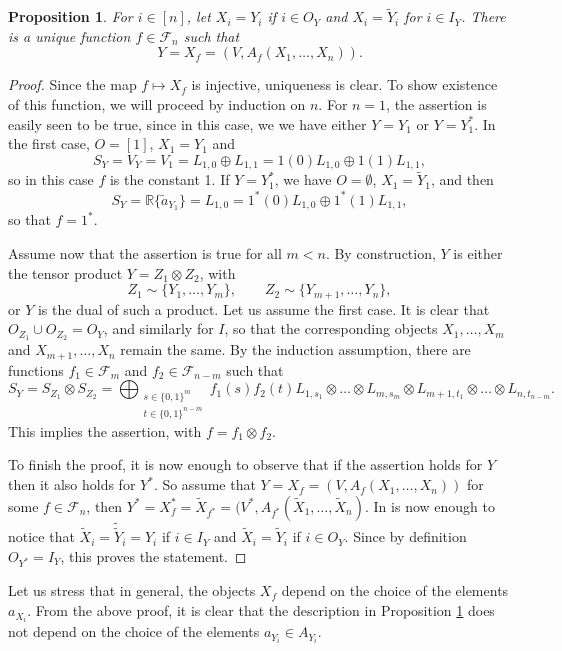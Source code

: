 \documentclass[12pt]{article}
\newtheorem{prop}{Proposition}
\theoremstyle{definition}
\theoremstyle{remark}
\def\Fe{\mathcal F}
\begin{document}
\begin{prop}\label{prop:boolean} For $i\in [n]$, let 
$X_i=Y_i$ if $i\in O_Y$ and $X_i=\tilde Y_i$ for $i\in I_Y$. 
There is a unique function $f\in \Fe_n$ such that 
\[
Y= X_f=(V, A_f(X_1,\dots,X_n)).
\]

\end{prop}

\begin{proof} Since the map $f\mapsto X_f$ is injective, uniqueness is clear.  To show existence of this
function, we will proceed by induction on $n$. For $n=1$, the assertion is easily seen
to be true, since in this case, we we have either $Y=Y_1$ or $Y=Y_1^*$. In the first case, $O=[1]$,
$X_1=Y_1$ and 
\[
S_Y=V_Y=V_1=L_{1,0}\oplus L_{1,1}=1(0)L_{1,0}\oplus 1(1)L_{1,1},
\]
so in this case $f$ is the constant 1. If $Y=Y_1^*$, we have $O=\emptyset$, $X_1=\tilde
Y_1$, and then
\[
S_Y=\mathbb R\{\tilde a_{Y_1}\}=L_{1,0}=1^*(0)L_{1,0}\oplus 1^*(1)L_{1,1},
\]
so that $f=1^*$. 

Assume now that the assertion is true for
all $m<n$. By construction, $Y$ is either the tensor
product $Y=Z_1\otimes Z_2$, with
\[
Z_1\sim \{Y_{1},\dots, Y_{m}\},\qquad Z_2\sim\{Y_{{m+1}},\dots, Y_{n}\},
\]
 or $Y$ is the dual of such a product. Let us assume the first case. It is clear that
 $O_{Z_1}\cup O_{Z_2}=O_Y$, and similarly for $I$, so that the corresponding objects
 $X_1,\dots, X_m$ and $X_{m+1},\dots,X_n$  remain the same. By the induction 
assumption, there are functions $f_1\in \Fe_m$ and $f_2\in \Fe_{n-m}$ such that
\[
S_Y=S_{Z_1}\otimes S_{Z_2}=\bigoplus_{\substack{s\in\{0,1\}^{m}\\ t\in
\{0,1\}^{n-m}}}
f_1(s)f_2(t)L_{1,s_{1}}\otimes\dots \otimes L_{m,s_{m}}\otimes
L_{{m+1},t_{1}}\otimes\dots\otimes L_{n,t_{n-m}}.
\]
This implies the assertion, with $f=f_1\otimes f_2$. 

To finish the proof, it is now enough to observe that if the assertion holds for $Y$ then
it also  holds for $Y^*$. So assume that $Y=X_f=(V, A_f(X_1,\dots,X_n))$ for some $f\in \Fe_n$,
then $Y^*=X_f^*=\tilde X_{f^*}=(V^*,A_{f^*}(\tilde X_1,\dots,\tilde X_n)$. 
In is now enough to notice that $\tilde X_i=\tilde{\tilde Y}_i=Y_i$
if $i\in I_{Y}$ and $\tilde X_i=\tilde {Y}_i$ if $i\in O_Y$. Since by definition
$O_{Y^*}=I_Y$, this proves the statement.

\end{proof}

Let us stress that in general, the objects $X_f$ depend on the choice of the elements
$a_{X_i}$. From the above proof, it is clear that  the  description in Proposition
\ref{prop:boolean} does not depend on the choice of the elements $a_{Y_i}\in A_{Y_i}$.
\end{document}

